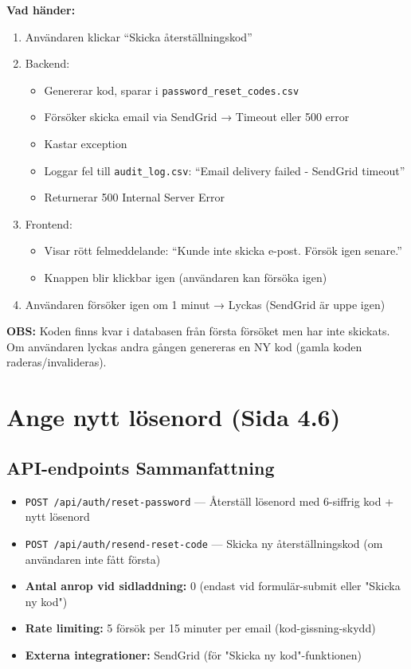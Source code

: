 \documentclass[12pt,a4paper]{article}
\begin{document}
\textbf{Vad händer:}
\begin{enumerate}[noitemsep]
  \item Användaren klickar ``Skicka återställningskod''
  \item Backend:
  \begin{itemize}[noitemsep]
    \item Genererar kod, sparar i \texttt{password\_reset\_codes.csv}
    \item Försöker skicka email via SendGrid → Timeout eller 500 error
    \item Kastar exception
    \item Loggar fel till \texttt{audit\_log.csv}: ``Email delivery failed - SendGrid timeout''
    \item Returnerar 500 Internal Server Error
  \end{itemize}
  \item Frontend:
  \begin{itemize}[noitemsep]
    \item Visar rött felmeddelande: ``Kunde inte skicka e-post. Försök igen senare.''
    \item Knappen blir klickbar igen (användaren kan försöka igen)
  \end{itemize}
  \item Användaren försöker igen om 1 minut → Lyckas (SendGrid är uppe igen)
\end{enumerate}

\textbf{OBS:} Koden finns kvar i databasen från första försöket men har inte skickats. Om användaren lyckas andra gången genereras en NY kod (gamla koden raderas/invalideras).

\newpage


\section{Ange nytt lösenord (Sida 4.6)}

\subsection{API-endpoints Sammanfattning}
\begin{itemize}[noitemsep]
  \item \texttt{POST /api/auth/reset-password} — Återställ lösenord med 6-siffrig kod + nytt lösenord
  \item \texttt{POST /api/auth/resend-reset-code} — Skicka ny återställningskod (om användaren inte fått första)
  \item \textbf{Antal anrop vid sidladdning:} 0 (endast vid formulär-submit eller "Skicka ny kod")
  \item \textbf{Rate limiting:} 5 försök per 15 minuter per email (kod-gissning-skydd)
  \item \textbf{Externa integrationer:} SendGrid (för "Skicka ny kod"-funktionen)
\end{itemize}
\end{document}
